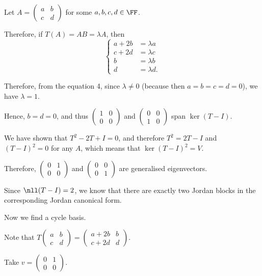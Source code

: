 \documentclass[11pt]{scrartcl}
\begin{document}
\begin{soln}
Let $A = 
\begin{pmatrix}
a & b\\
c & d
\end{pmatrix}$ for some $a, b, c, d\in \FF$.

Therefore, if $T(A) = AB=\lambda A$, then
\begin{equation*}
  \begin{cases}
a+2b &= \lambda a\\
c+2d &= \lambda c\\
b & = \lambda b\\
d & = \lambda d.
  \end{cases}
\end{equation*}

Therefore, from the equation 4, since $\lambda \neq 0$ (because  then $a=b=c=d = 0$), we have $\lambda = 1$.

Hence, $b = d = 0$, and thus 
$\begin{pmatrix}
1 & 0\\
0 & 0
\end{pmatrix}$ and
$\begin{pmatrix}
0 & 0\\
1 & 0
\end{pmatrix}$ span $\ker (T-I)$.



We have shown that $T^2-2T+I = 0$, and therefore $T^2= 2T - I$ and $(T-I)^2=0$ for any $A$, which means that $\ker (T-I)^2 = V$.

Therefore, $
\begin{pmatrix}
0 & 1\\
0 & 0
\end{pmatrix}$ and $
\begin{pmatrix}
0 & 0\\
0 & 1
\end{pmatrix}$ are generalised eigenvectors.

Since $\nll (T-I) = 2$, we know that there are exactly two Jordan blocks in the corresponding Jordan canonical form.

Now we find a cycle basis.

Note that $T \begin{pmatrix}
a & b\\
c & d
\end{pmatrix}= 
\begin{pmatrix}
a+2b & b\\
c+2d & d
\end{pmatrix}
$.

Take $v = 
\begin{pmatrix}
0 & 1 \\
0 & 0
\end{pmatrix}$.


\end{soln}
\end{document}
